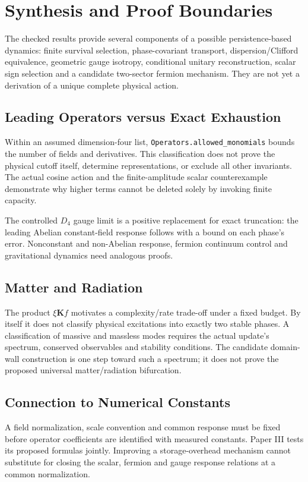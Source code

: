 \section{Synthesis and Proof Boundaries}
\label{sec:synthesis}

The checked results provide several components of a possible persistence-based dynamics: finite survival selection, phase-covariant transport, dispersion/Clifford equivalence, geometric gauge isotropy, conditional unitary reconstruction, scalar sign selection and a candidate two-sector fermion mechanism. They are not yet a derivation of a unique complete physical action.

\subsection{Leading Operators versus Exact Exhaustion}
Within an assumed dimension-four list, \nolinkurl{Operators.allowed_monomials} bounds the number of fields and derivatives. This classification does not prove the physical cutoff itself, determine representations, or exclude all other invariants. The actual cosine action and the finite-amplitude scalar counterexample demonstrate why higher terms cannot be deleted solely by invoking finite capacity.

The controlled $D_4$ gauge limit is a positive replacement for exact truncation: the leading Abelian constant-field response follows with a bound on each phase's error. Nonconstant and non-Abelian response, fermion continuum control and gravitational dynamics need analogous proofs.

\subsection{Matter and Radiation}
\label{sec:matter_radiation}
The product $\xi\mathbf K f$ motivates a complexity/rate trade-off under a fixed budget. By itself it does not classify physical excitations into exactly two stable phases. A classification of massive and massless modes requires the actual update's spectrum, conserved observables and stability conditions. The candidate domain-wall construction is one step toward such a spectrum; it does not prove the proposed universal matter/radiation bifurcation.

\subsection{Connection to Numerical Constants}
A field normalization, scale convention and common response must be fixed before operator coefficients are identified with measured constants. Paper III tests its proposed formulas jointly. Improving a storage-overhead mechanism cannot substitute for closing the scalar, fermion and gauge response relations at a common normalization.
